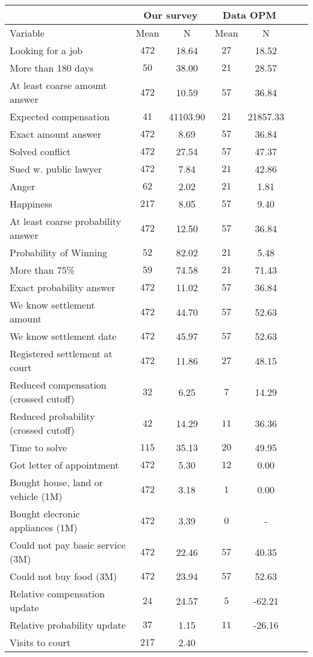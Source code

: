 \begin{tabular}{@{\extracolsep{5pt}} lcccccc} 
\toprule
  & \multicolumn{2}{c}{Our survey} & \multicolumn{2}{c}{Data OPM} \\
  \midrule
Variable & Mean & N & Mean & N \\ 
\midrule
\midrule
 Looking for a job & $472$ &    18.64 & $27$ &    18.52 \\ 
More than 180 days & $50$ &    38.00 & $21$ &    28.57 \\ 
At least coarse amount answer & $472$ &    10.59 & $57$ &    36.84 \\ 
Expected compensation & $41$ & 41103.90 & $21$ & 21857.33 \\ 
Exact amount answer & $472$ &     8.69 & $57$ &    36.84 \\ 
Solved conflict & $472$ &    27.54 & $57$ &    47.37 \\ 
Sued w. public lawyer & $472$ &     7.84 & $21$ &    42.86 \\ 
Anger & $62$ &     2.02 & $21$ &     1.81 \\ 
Happiness & $217$ &     8.05 & $57$ &     9.40 \\ 
At least coarse probability answer & $472$ &    12.50 & $57$ &    36.84 \\ 
Probability of Winning & $52$ &    82.02 & $21$ &     5.48 \\ 
More than 75\% & $59$ &    74.58 & $21$ &    71.43 \\ 
Exact probability answer & $472$ &    11.02 & $57$ &    36.84 \\ 
We know settlement amount & $472$ &    44.70 & $57$ &    52.63 \\ 
We know settlement date & $472$ &    45.97 & $57$ &    52.63 \\ 
Registered settlement at court & $472$ &    11.86 & $27$ &    48.15 \\ 
Reduced compensation (crossed cutoff) & $32$ &     6.25 & $7$ &    14.29 \\ 
Reduced probability (crossed cutoff) & $42$ &    14.29 & $11$ &    36.36 \\ 
Time to solve & $115$ &    35.13 & $20$ &    49.95 \\ 
Got letter of appointment & $472$ &     5.30 & $12$ &     0.00 \\ 
Bought house, land or vehicle (1M) & $472$ &     3.18 & $1$ &     0.00 \\ 
Bought elecronic appliances (1M) & $472$ &     3.39 & $0$ & - \\ 
Could not pay basic service (3M) & $472$ &    22.46 & $57$ &    40.35 \\ 
Could not buy food (3M) & $472$ &    23.94 & $57$ &    52.63 \\ 
Relative compensation update & $24$ &    24.57 & $5$ &   -62.21 \\ 
Relative probability update & $37$ &     1.15 & $11$ &   -26.16 \\ 
Visits to court & $217$ &     2.40 & $$ &  \\ 
\bottomrule
\end{tabular} 